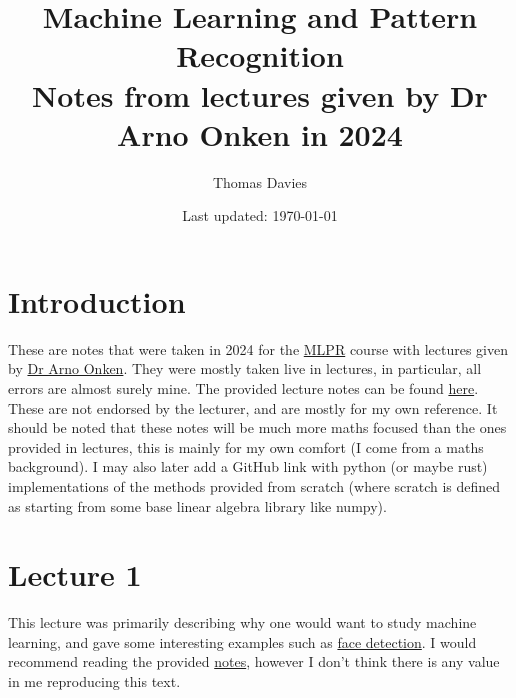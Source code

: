 \documentclass[letterpaper, 12pt]{article}
\newcommand{\1}{\mathds{1}}	%
\begin{document}

\title{Machine Learning and Pattern Recognition \\[1em]
\normalsize Notes from lectures given by Dr Arno Onken in 2024}


\author{\normalsize Thomas Davies}
\date{\normalsize\vspace{-1ex} Last updated: \today}


\maketitle
\tableofcontents\label{sec:contents}

%


\newpage
\section{Introduction}
These are notes that were taken in 2024 for the \href{https://mlpr.inf.ed.ac.uk/2024/}{MLPR} course with lectures given by \href{https://homepages.inf.ed.ac.uk/aonken/}{Dr Arno Onken}. 
They were mostly taken live in lectures, in particular, all errors are almost surely mine.
The provided lecture notes can be found \href{https://mlpr.inf.ed.ac.uk/2024/notes/}{here}. These are not endorsed by the lecturer, and are mostly for my own reference.
It should be noted that these notes will be much more maths focused than the ones provided in lectures, this is mainly for my own comfort (I come from a maths background).
I may also later add a GitHub link with python (or maybe rust) implementations of the methods provided from scratch (where scratch is defined as starting from some base linear algebra library like numpy).

\section{Lecture 1}
\label{sec:Lecture 1}
This lecture was primarily describing why one would want to study machine learning, and gave some interesting examples such as \href{https://citeseerx.ist.psu.edu/viewdoc/summary?doi=10.1.1.10.6807}{face detection}. I would recommend reading the provided \href{https://mlpr.inf.ed.ac.uk/2024/notes/w1a_intro.html}{notes}, however I don't think there is any value in me reproducing this text.
\end{document}
